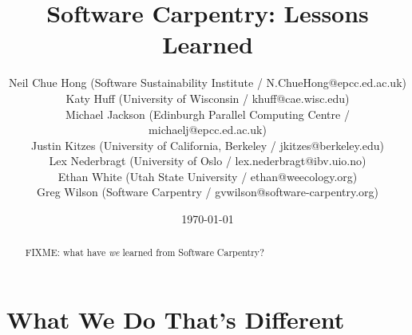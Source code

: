 \documentclass{article}
\begin{document}
\title{Software Carpentry: Lessons Learned}
\date{\today}

\author{
  Neil Chue Hong (Software Sustainability Institute / N.ChueHong@epcc.ed.ac.uk)\\
  Katy Huff (University of  Wisconsin / khuff@cae.wisc.edu)\\
  Michael Jackson (Edinburgh Parallel Computing Centre / michaelj@epcc.ed.ac.uk)\\
  Justin Kitzes (University of California, Berkeley / jkitzes@berkeley.edu)\\
  Lex Nederbragt (University of Oslo / lex.nederbragt@ibv.uio.no)\\
  Ethan White (Utah State University / ethan@weecology.org)\\
  Greg Wilson (Software Carpentry / gvwilson@software-carpentry.org)
}

\maketitle

\begin{abstract}
FIXME: what have \emph{we} learned from Software Carpentry?
\end{abstract}

\section{What We Do That's Different}
\end{document}

